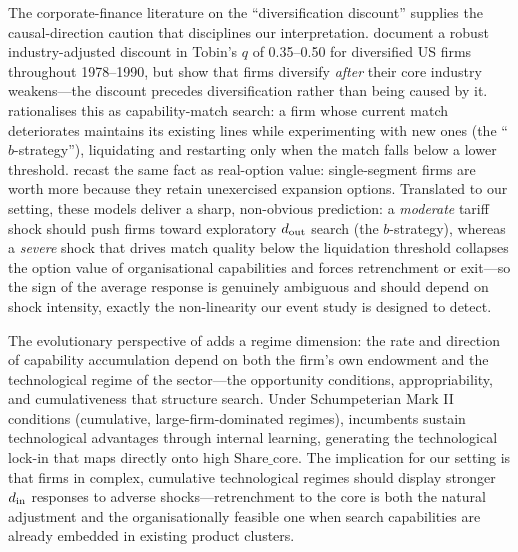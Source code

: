 The corporate-finance literature on the ``diversification discount'' supplies the
causal-direction caution that disciplines our interpretation. \citet{langstulz1994}
document a robust industry-adjusted discount in Tobin's $q$ of 0.35--0.50 for
diversified US firms throughout 1978--1990, but show that firms diversify \emph{after}
their core industry weakens---the discount precedes diversification rather than being
caused by it. \citet{matsusaka2001} rationalises this as capability-match search: a
firm whose current match deteriorates maintains its existing lines while experimenting
with new ones (the ``$b$-strategy''), liquidating and restarting only when the match
falls below a lower threshold. \citet{bernardo2002} recast the same fact as
real-option value: single-segment firms are worth more because they retain unexercised
expansion options. Translated to our setting, these models deliver a sharp,
non-obvious prediction: a \emph{moderate} tariff shock should push firms toward
exploratory $d_{\rm out}$ search (the $b$-strategy), whereas a \emph{severe} shock that
drives match quality below the liquidation threshold collapses the option value of
organisational capabilities and forces retrenchment or exit---so the sign of the
average response is genuinely ambiguous and should depend on shock intensity, exactly
the non-linearity our event study is designed to detect.

The evolutionary perspective of \citet{dosi1988, dosi1995} adds a regime dimension:
the rate and direction of capability accumulation depend on both the firm's own
endowment and the technological regime of the sector---the opportunity conditions,
appropriability, and cumulativeness that structure search. Under Schumpeterian Mark
II conditions (cumulative, large-firm-dominated regimes), incumbents sustain
technological advantages through internal learning, generating the technological
lock-in that maps directly onto high $\text{Share\_core}$. The implication for our
setting is that firms in complex, cumulative technological regimes should display
stronger $d_{\rm in}$ responses to adverse shocks---retrenchment to the core is both
the natural adjustment and the organisationally feasible one when search capabilities
are already embedded in existing product clusters.

